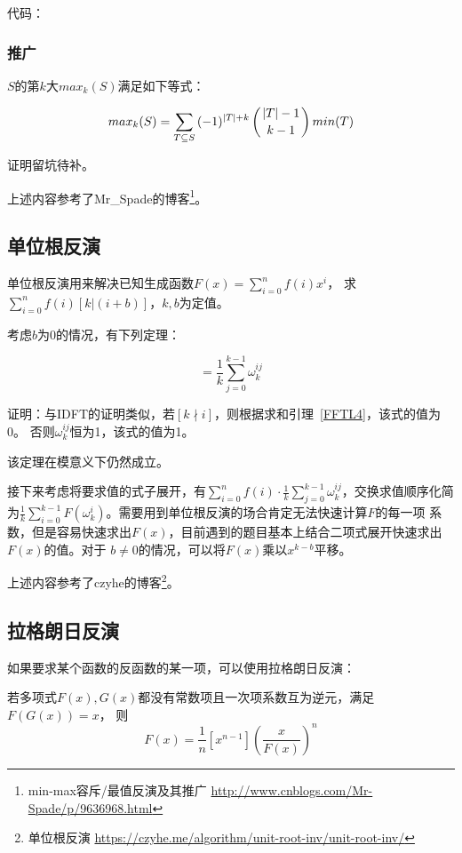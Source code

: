 代码：


\subsubsection{推广}
$S$的第$k$大$max_k(S)$满足如下等式：

\begin{displaymath}
	max_k(S)=\sum_{T\subseteq S}{(-1)^{|T|+k}\left(|T|-1 \atop k-1\right)min(T)}
\end{displaymath}

证明留坑待补。

上述内容参考了Mr\_Spade的博客\footnote{
	min-max容斥/最值反演及其推广
	\url{http://www.cnblogs.com/Mr-Spade/p/9636968.html}
}。
\subsection{单位根反演}
单位根反演用来解决已知生成函数$F(x)=\displaystyle \sum_{i=0}^n{f(i)x^i}$，
求$\displaystyle \sum_{i=0}^n{f(i)[k|(i+b)]}$，$k,b$为定值。

考虑$b$为0的情况，有下列定理：
\begin{theorem}
	\begin{displaymath}
		[k|i]=\frac{1}{k}\sum_{j=0}^{k-1}{\omega_k^{ij}}
	\end{displaymath}
\end{theorem}

证明：与IDFT的证明类似，若$[k\nmid i]$，则根据求和引理~\ref{FFTL4}，该式的值为0。
否则$\omega_k^{ij}$恒为1，该式的值为1。

该定理在模意义下仍然成立。

接下来考虑将要求值的式子展开，有$\displaystyle \sum_{i=0}^n{f(i)\cdot \frac{1}{k}
\sum_{j=0}^{k-1}{\omega_k^{ij}}}$，交换求值顺序化简为$\frac{1}{k}\displaystyle
\sum_{i=0}^{k-1}{F(\omega_k^i)}$。需要用到单位根反演的场合肯定无法快速计算$F$的每一项
系数，但是容易快速求出$F(x)$，目前遇到的题目基本上结合二项式展开快速求出$F(x)$的值。对于
$b\neq 0$的情况，可以将$F(x)$乘以$x^{k-b}$平移。

上述内容参考了czyhe的博客\footnote{
	单位根反演
\url{https://czyhe.me/algorithm/unit-root-inv/unit-root-inv/}}。
\subsection{拉格朗日反演}
如果要求某个函数的反函数的某一项，可以使用拉格朗日反演：
\begin{theorem}
	若多项式$F(x),G(x)$都没有常数项且一次项系数互为逆元，满足$F(G(x))=x$，
	则\begin{displaymath}
		[x_n]F(x)=\frac{1}{n}[x^{n-1}](\frac{x}{F(x)})^n
	\end{displaymath}
\end{theorem}
